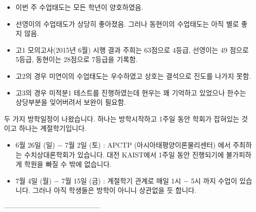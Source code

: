 \documentclass[idxtotoc,hyperref,openany]{labbook} %
\begin{document}

\begin{itemize}
	\item 이번 주 수업태도는 모든 학년이 양호하였음.
	\item 선영이의 수업태도가 상당히 좋아졌음. 그러나 동현이의 수업태도는 아직 별로 좋지 않음.
	\item 고1 모의고사(2015년 6월) 시행 결과 주희는 63점으로 4등급, 선영이는 49 점으로 5등급, 동현이는 28점으로 7등급을 기록함.
	\item 고2의 경우 미연이의 수업태도는 우수하였고 상호는 결석으로 진도를 나가지 못함.
	\item 고3의 경우 미적분1 테스트를 진행하였는데 현우는 꽤 기억하고 있었으나 한수는 상당부분을 잊어버려서 보완이 필요함.
\end{itemize}

두 가지 방학일정이 나왔습니다. 하나는 방학시작하고 1주일 동안 학회가 잡혀있는 것이고 하나는 계절학기입니다.
\begin{itemize}
 \item 6월 26일 (일) $-$ 7월 2일 (토) : APCTP (아시아태평양이론물리센터) 에서 주최하는 수치상대론학회가 있습니다. 대전 KAIST에서 1주일 동안 진행되기에 불가피하게 학원을 빠질 수 밖에 없습니다.
 \item 7월 4일 (월) $-$ 7월 15일 (금) : 계절학기 관계로 매일 1시 $-$ 5시 까지 수업이 있습니다. 그러나 아직 학생들은 방학이 아니니 상관없을 듯 합니다.
\end{itemize}





------------------------------------------










\end{document}
